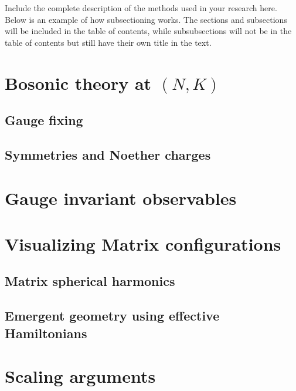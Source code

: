 
Include the complete description of the methods used in your research here. \\

\noindent Below is an example of how subsectioning works. The sections and subsections will be included in the table of contents, while subsubsections will not be in the table of contents but still have their own title in the text.

\section{Bosonic theory at $(N, K)$}

\subsection{Gauge fixing}

\subsection{Symmetries and Noether charges}

\section{Gauge invariant observables}

\section{Visualizing Matrix configurations}

\subsection{Matrix spherical harmonics}

\subsection{Emergent geometry using effective Hamiltonians}

\section{Scaling arguments}